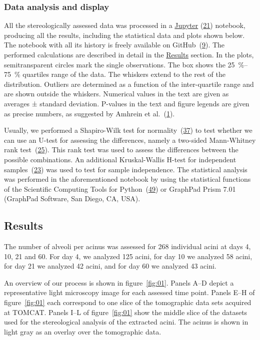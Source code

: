\documentclass[
  american,
]{article}
\begin{document}
\hypertarget{data-analysis-and-display}{%
\subsubsection{Data analysis and display}\label{data-analysis-and-display}}

All the stereologically assessed data was processed in a \href{http://jupyter.org/}{Jupyter} (\protect\hyperlink{ref-pQ6Wbz73}{21}) notebook, producing all the results, including the statistical data and plots shown below.
The notebook with all its history is freely available on GitHub~(\protect\hyperlink{ref-V87xbt0b}{9}).
The performed calculations are described in detail in the \protect\hyperlink{results}{Results} section.
In the plots, semitransparent circles mark the single observations.
The box shows the 25~\%--75~\% quartiles range of the data.
The whiskers extend to the rest of the distribution.
Outliers are determined as a function of the inter-quartile range and are shown outside the whiskers.
Numerical values in the text are given as averages ± standard deviation.
P-values in the text and figure legends are given as precise numbers, as suggested by Amhrein et al.~(\protect\hyperlink{ref-o21zxPIu}{1}).

Usually, we performed a Shapiro-Wilk test for normality~(\protect\hyperlink{ref-IkHrgIj3}{37}) to test whether we can use an U-test for assessing the differences, namely a two-sided Mann-Whitney rank test~(\protect\hyperlink{ref-MyzxBJ57}{25}).
This rank test was used to assess the differences between the possible combinations.
An additional Kruskal-Wallis H-test for independent samples~(\protect\hyperlink{ref-ON1Bppkk}{23}) was used to test for sample independence.
The statistical analysis was performed in the aforementioned notebook by using the statistical functions of the Scientific Computing Tools for Python~(\protect\hyperlink{ref-8Miti2Gz}{49}) or GraphPad Prism 7.01 (GraphPad Software, San Diego, CA, USA).

\hypertarget{results}{%
\subsection{Results}\label{results}}

The number of alveoli per acinus was assessed for 268 individual acini at days 4, 10, 21 and 60.
For day 4, we analyzed 125 acini, for day 10 we analyzed 58 acini, for day 21 we analyzed 42 acini, and for day 60 we analyzed 43 acini.

An overview of our process is shown in figure~\ref{fig:01}.
Panels A--D depict a representative light microscopy image for each assessed time point.
Panels E--H of figure~\ref{fig:01} each correspond to one slice of the tomographic data sets acquired at TOMCAT.
Panels I--L of figure~\ref{fig:01} show the middle slice of the datasets used for the stereological analysis of the extracted acini.
The acinus is shown in light gray as an overlay over the tomographic data.
\end{document}
